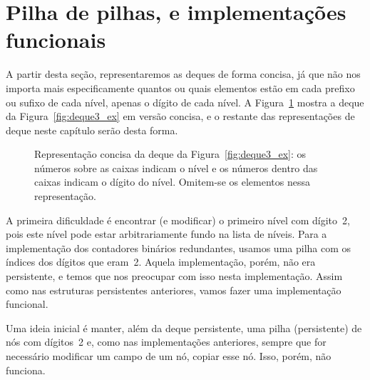 \documentclass[main.tex]{subfiles}
\begin{document}
\section{Pilha de pilhas, e implementações funcionais} \label{sec:implfunc}

A partir desta seção, representaremos as deques de forma concisa, já que não nos importa mais especificamente quantos ou quais elementos estão em cada prefixo ou sufixo de cada nível, apenas o dígito de cada nível. A Figura~\ref{fig:deque3_ex2} mostra a deque da Figura~\ref{fig:deque3_ex} em versão concisa, e o restante das representações de deque neste capítulo serão desta forma.

\begin{figure}[h]
\centering
{}
\caption{Representação concisa da deque da Figura~\ref{fig:deque3_ex}: os números sobre as caixas indicam o nível e os números dentro das caixas indicam o dígito do nível. Omitem-se os elementos nessa representação.} \label{fig:deque3_ex2}
\end{figure}

A primeira dificuldade é encontrar (e modificar) o primeiro nível com dígito~2, pois este nível pode estar arbitrariamente fundo na lista de níveis. Para a implementação dos contadores binários redundantes, usamos uma pilha com os índices dos dígitos que eram~2. Aquela implementação, porém, não era persistente, e temos que nos preocupar com isso nesta implementação. Assim como nas estruturas persistentes anteriores, vamos fazer uma implementação funcional.

Uma ideia inicial é manter, além da deque persistente, uma pilha (persistente) de nós com dígitos~2 e, como nas implementações anteriores, sempre que for necessário modificar um campo de um nó, copiar esse nó. Isso, porém, não funciona.

\end{document}
